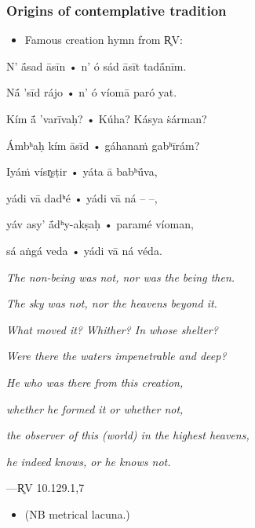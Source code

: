 \documentclass[pdf]{beamer}
\begin{document}
\begin{frame} \frametitle{Origins of contemplative tradition}
\begin{itemize}
	\item Famous creation hymn from R̥V:
\end{itemize}

\begin{center}
\begin{multicols}{2}
\scriptsize{
	N' ā́sad āsīn • n' ó sád āsīt tadā́nīm.

	Nā́ 'sīd rájo • n' ó víomā paró yat.

	Kím ā́ 'varīvaḥ? • Kúha? Kásya ṡárman?

	Ámbʰaḥ kím āsīd • gáhanaṁ gabʰīrám?

	\vspace{12pt}

	Iyáṁ vísr̥ṣṭir • yáta ā babʰū́va,

	yádi vā dadʰé • yádi vā ná -- --,

	yáv asy' ā́dʰy-akṣaḥ • paramé víoman,

	sá aṅgá veda • yádi vā ná véda.

	\columnbreak

	\textit{The non-being was not, nor was the being then.}

	\textit{The sky was not, nor the heavens beyond it.}

	\textit{What moved it? Whither? In whose shelter?}

	\textit{Were there the waters impenetrable and deep?}

	\vspace{12pt}

	\textit{He who was there from this creation,}

	\textit{whether he formed it or whether not,}

	\textit{the observer of this (world) in the highest heavens,}

	\textit{he indeed knows, or he knows not.}
}
\end{multicols}
 ---R̥V 10.129.1,7
\end{center}

\begin{itemize}
	\item (NB metrical lacuna.)
\end{itemize}
\end{frame}
\end{document}
